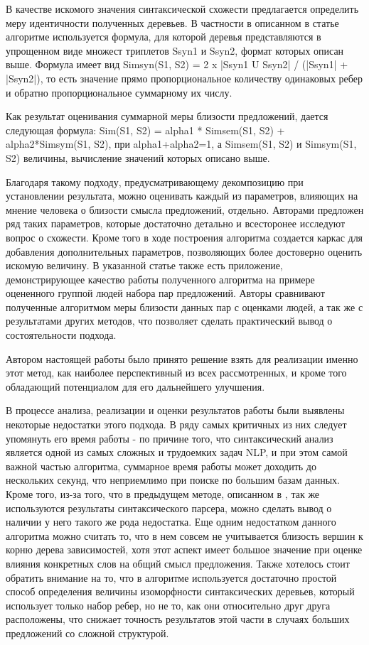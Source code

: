 В качестве искомого значения синтаксической схожести предлагается определить меру идентичности
полученных деревьев. В частности в описанном в статье алгоритме
используется формула, для которой деревья представляются в упрощенном виде
множест триплетов Ssyn1 и Ssyn2, формат которых описан выше.
Формула имеет вид Simsyn(S1, S2) = 2 x |Ssyn1 U Ssyn2| / (|Ssyn1| + |Ssyn2|), 
то есть значение прямо пропорциональное количеству одинаковых ребер
и обратно пропорциональное суммарному их числу.


Как результат оценивания суммарной меры близости предложений, 
дается следующая формула:
Sim(S1, S2) = alpha1 * Simsem(S1, S2) + alpha2*Simsym(S1, S2), при alpha1+alpha2=1,
а Simsem(S1, S2) и Simsym(S1, S2) величины, вычисление значений которых
описано выше.

Благодаря такому подходу, предусматривающему декомпозицию при установлении результата, 
можно оценивать каждый из параметров, влияющих на мнение человека о близости
смысла предложений, отдельно. Авторами предложен ряд таких параметров, 
которые достаточно детально и всесторонее исследуют вопрос о схожести. Кроме того
в ходе построения алгоритма создается каркас для добавления дополнительных параметров,
позволяющих более достоверно оценить искомую величину. 
В указанной статье также есть приложение, демонстрирующее качество работы
полученного алгоритма на примере оцененного группой людей набора пар предложений.
Авторы сравнивают полученные алгоритмом меры близости данных пар с оценками людей, 
а так же с результатами других методов, что позволяет сделать практический вывод
о состоятельности подхода.

Автором настоящей работы было принято решение взять для реализации именно этот метод,
как наиболее перспективный из всех рассмотренных, и кроме того обладающий
потенциалом для его дальнейшего улучшения.

В процессе анализа, реализации и оценки результатов работы были выявлены
некоторые недостатки этого подхода.
В ряду самых критичных из них следует упомянуть его время работы - 
по причине того, что синтаксический анализ является одной из самых
сложных и трудоемких задач NLP, и при этом самой важной частью алгоритма,
суммарное время работы может доходить до нескольких секунд,
что неприемлимо при поиске по большим базам данных.
Кроме того, из-за того, что в предыдущем методе, описанном в \cite{weightedDep},
так же используются результаты синтаксического парсера, можно сделать вывод
о наличии у него такого же рода недостатка.
Еще одним недостатком данного алгоритма можно считать то, что в нем совсем
не учитывается близость вершин к корню дерева зависимостей, хотя этот аспект
имеет большое значение при оценке влияния конкретных слов на общий смысл
предложения.
Также хотелось стоит обратить внимание на то, что в алгоритме
используется достаточно простой способ определения величины изоморфности
синтаксических деревьев, который использует только набор ребер, но не то,
как они относительно друг друга расположены, что снижает точность
результатов этой части в случаях больших предложений со сложной структурой.




